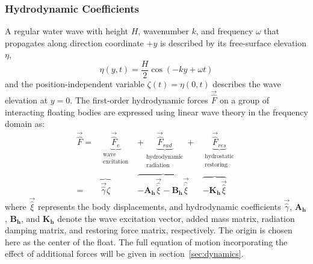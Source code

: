 \subsubsection{Hydrodynamic Coefficients}\label{sec:meem}
A regular water wave with height $H$, wavenumber $k$, and frequency $\omega$ that propagates along direction coordinate $+y$ is described by its free-surface elevation $\eta$,
\begin{equation}
    \eta(y,t)=\frac{H}{2}\cos(-ky+\omega t)
\end{equation}
and the position-independent variable $\zeta(t)=\eta(0,t)$ describes the wave elevation at $y=0$.
The first-order hydrodynamic forces $\vec{\hat{F}}$ on a group of interacting floating bodies are expressed using linear wave theory in the frequency domain as:
\setlength\arraycolsep{0pt}
\begin{equation}\label{eq:eom}
\begin{array}{rCCCCC}
     \vec{\hat{F}} = & \underbrace{\vec{\hat{F}}_{e}}_{\substack{\textrm{wave} \\  \textrm{excitation} }} & +\underbrace{\vec{\hat{F}}_{rad}}_{\substack{\text{hydrodynamic} \\ \text{radiation} }} +&  \underbrace{ \vec{\hat{F}}_{res}}_{\substack{\textrm{hydrostatic} \\ \text{restoring} }} \\
    = & \overbrace{\vec{\hat{\gamma}} \hat{\zeta}} & \overbrace{-\mathbf{A_h}\vec{\hat{\ddot{\xi}}} - \mathbf{B_h}\vec{\hat{\dot{\xi}}}} &  \overbrace{-\mathbf{K_h}\vec{\hat{\xi}}}
\end{array}
\end{equation}
where $\vec{\hat{\xi}}$ represents the body displacements, and hydrodynamic coefficients $\vec{\hat{\gamma}}$, $\mathbf{A_h}$, $\mathbf{B_h}$, and $\mathbf{K_h}$ denote the wave excitation vector, added mass matrix, radiation damping matrix, and restoring force matrix, respectively.
The origin is chosen here as the center of the float.
The full equation of motion incorporating the effect of additional forces will be given in section~\ref{sec:dynamics}.

